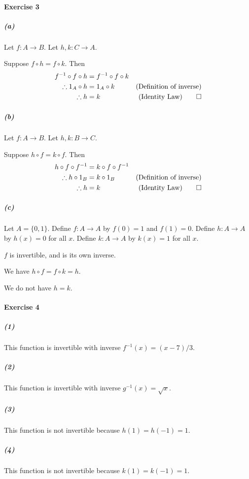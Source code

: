 \documentclass{report}
\newcommand{\inv}[1]{\ensuremath{{#1}^{-1}}}
\begin{document}
    \paragraph{Exercise 3}
    \subparagraph{(a)}
    Let $f : A \rightarrow B$. Let $h, k : C \rightarrow A$.

    Suppose $f \circ h = f \circ k$. Then
    \begin{align*}
        \inv{f} \circ f \circ h & = \inv{f} \circ f \circ k \\
        \therefore 1_A \circ h & = 1_A \circ k & (\text{Definition of inverse}) \\
        \therefore h & = k & (\text{Identity Law}) \qed
    \end{align*}

    \subparagraph{(b)}
    Let $f : A \rightarrow B$. Let $h, k : B \rightarrow C$.

    Suppose $h \circ f = k \circ f$. Then
    \begin{align*}
        h \circ f \circ \inv{f} & = k \circ f \circ \inv{f} \\
        \therefore h \circ 1_B & = k \circ 1_B & (\text{Definition of inverse}) \\
        \therefore h & = k & (\text{Identity Law}) \qed
    \end{align*}

    \subparagraph{(c)}
    Let $A = \{ 0,1 \}$. Define $f : A \rightarrow A$ by $f(0) = 1$ and $f(1) = 0$. Define $h : A \rightarrow A$
    by $h(x) = 0$ for all $x$. Define $k : A \rightarrow A$ by $k(x) = 1$ for all $x$.

    $f$ is invertible, and is its own inverse.

    We have $h \circ f = f \circ k = h$.

    We do not have $h = k$.

    \paragraph{Exercise 4}
    \subparagraph{(1)}
    This function is invertible with inverse $\inv{f}(x) = (x-7)/3$.

    \subparagraph{(2)}
    This function is invertible with inverse $\inv{g}(x) = \sqrt{x}$.

    \subparagraph{(3)}
    This function is not invertible because $h(1) = h(-1) = 1$.

    \subparagraph{(4)}
    This function is not invertible because $k(1) = k(-1) = 1$.
\end{document}
